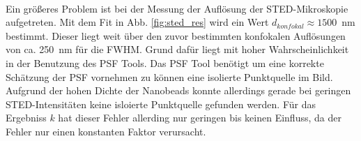 \\
Ein größeres Problem ist bei der Messung der Auflösung der STED-Mikroskopie aufgetreten. Mit dem Fit in Abb. \ref{fig:sted_res} wird ein Wert $d_{konfokal} \approx 1500$~nm bestimmt.
Dieser liegt weit über den zuvor bestimmten konfokalen Auflösungen von ca. 250~nm für die FWHM.
Grund dafür liegt mit hoher Wahrscheinlichkeit in der Benutzung des PSF Tools.
Das PSF Tool benötigt um eine korrekte Schätzung der PSF vornehmen zu können eine isolierte Punktquelle im Bild.
Aufgrund der hohen Dichte der Nanobeads konnte allerdings gerade bei geringen STED-Intensitäten keine isloierte Punktquelle gefunden werden. 
Für das Ergebniss $k$ hat dieser Fehler allerding nur geringen bis keinen Einfluss, da der Fehler nur einen konstanten Faktor verursacht.

